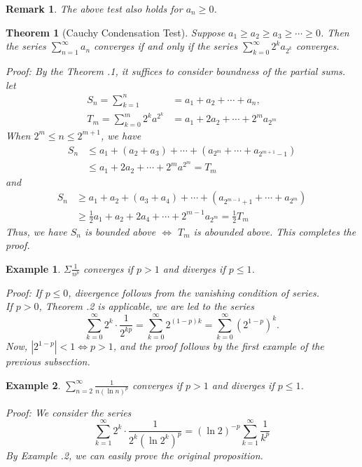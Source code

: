 \documentclass[12pt]{article}
\theoremstyle{oneline}
\newtheorem{theorem}{Theorem}[subsection]
\newtheorem{remark}{Remark}[subsection]
\newtheorem{example}{Example}[subsection]
\theoremstyle{twoline}
\begin{document}
\begin{remark}
  The above test also holds for $a_n\geq0$.
\end{remark}

\begin{theorem}[Cauchy Condensation Test]
  Suppose $a_1\geq a_2\geq a_3\geq\cdots\geq0$. Then the series $\sum\limits_{n=1}^{\infty} a_n$ converges if and only if the series $\sum\limits_{k=0}^\infty 2^ka_{2^k}$ converges.

\textit{Proof:} By the \textit{Theorem \thesubsection.1}, it suffices to consider boundness of the partial sums. let
\begin{align*}
  S_n=\sum\limits_{k=1}^n&=a_1+a_2+\cdots+a_n,\\
  T_m=\sum\limits_{k=0}^m2^ka^{2^k}&=a_1+2a_2+\cdots+2^ma_{2^m}
\end{align*}
When $2^m\leq n\leq 2^{m+1}$, we have
\begin{align*}
  S_n&\leq a_1+(a_2+a_3)+\cdots+(a_{2^m}+\cdots+a_{2^{m+1}-1})\\ 
  &\leq a_1+2a_2+\cdots+2^ma^{2^m}=T_m
\end{align*}
and 
\begin{align*}
  S_n&\geq a_1+a_2+(a_3+a_4)+\cdots+(a_{2^{m-1}+1}+\cdots+a_{2^m})\\
  &\geq \frac12 a_1+a_2+2a_4+\cdots+2^{m-1}a_{2^m}=\frac12T_m
\end{align*}
Thus, we have $S_n$ is bounded above $\iff$ $T_m$ is abounded above. This completes the proof.
\end{theorem}

\begin{example}
  $\Sigma \frac1{n^p}$ converges if $p>1$ and diverges if $p\leq 1$.

\textit{Proof:} If $p\leq 0$, divergence follows from the vanishing condition of series. \\
If $p>0$, \textit{Theorem \thesubsection.2} is applicable, we are led to the series 
\[\sum\limits_{k=0}^{\infty}2^k\cdot\frac1{2^{kp}}=\sum\limits_{k=0}^{\infty}2^{(1-p)k}=\sum\limits_{k=0}^{\infty}(2^{1-p})^k.\]
Now, $|2^{1-p}|<1\iff p>1$, and the proof follows by the first example of the previous subsection.
\end{example}

\begin{example}
  $\sum\limits_{n=2}^{\infty} \frac1{n(\ln n)^p}$ converges if $p>1$ and diverges if $p\leq 1$.

\textit{Proof:} We consider the series 
\[\sum\limits_{k=1}^{\infty}2^k\cdot\frac1{2^k(\ln 2^k)^p}=(\ln 2)^{-p}\sum\limits_{k=1}^\infty\frac1{k^p}\]
By \textit{Example \thesubsection.2}, we can easily prove the original proposition.
\end{example}
\end{document}
